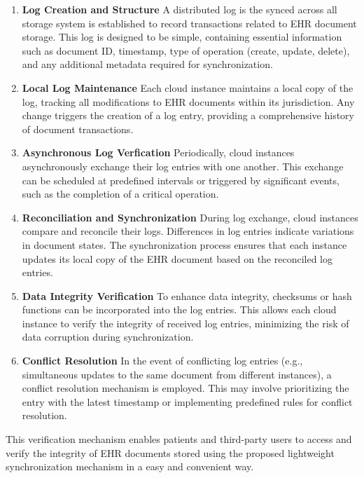 \documentclass[runningheads]{llncs}
\begin{document}
\begin{enumerate}    
\item \textbf{Log Creation and Structure} 
A distributed log is the synced across all storage system is established to record transactions related to EHR document storage. This log is designed to be simple, containing essential information such as document ID, timestamp, type of operation (create, update, delete), and any additional metadata required for synchronization.

\item \textbf{Local Log Maintenance} Each cloud instance maintains a local copy of the log, tracking all modifications to EHR documents within its jurisdiction. Any change triggers the creation of a log entry, providing a comprehensive history of document transactions.

\item \textbf{Asynchronous Log Verfication} Periodically, cloud instances asynchronously exchange their log entries with one another. This exchange can be scheduled at predefined intervals or triggered by significant events, such as the completion of a critical operation.

\item \textbf{Reconciliation and Synchronization} During log exchange, cloud instances compare and reconcile their logs. Differences in log entries indicate variations in document states. The synchronization process ensures that each instance updates its local copy of the EHR document based on the reconciled log entries.

\item \textbf{Data Integrity Verification} To enhance data integrity, checksums or hash functions can be incorporated into the log entries. This allows each cloud instance to verify the integrity of received log entries, minimizing the risk of data corruption during synchronization.

\item \textbf{Conflict Resolution} In the event of conflicting log entries (e.g., simultaneous updates to the same document from different instances), a conflict resolution mechanism is employed. This may involve prioritizing the entry with the latest timestamp or implementing predefined rules for conflict resolution.

\end{enumerate}

This verification mechanism enables patients and third-party users to access and verify the integrity of EHR documents stored using the proposed lightweight synchronization mechanism in a easy and convenient way. 
\end{document}
